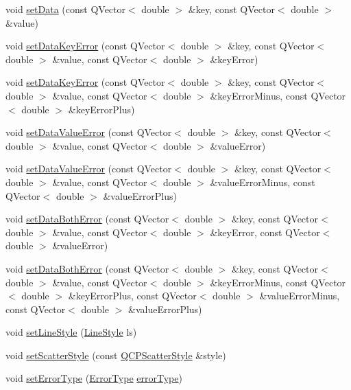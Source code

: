 \begin{DoxyCompactItemize}
\item 
void \hyperlink{classQCPGraph_a4c55d8ac13bfa42c8c93747820891a76}{set\+Data} (const Q\+Vector$<$ double $>$ \&key, const Q\+Vector$<$ double $>$ \&value)
\item 
void \hyperlink{classQCPGraph_abce9f07c0d722bc3e4fa7bd73c7e5dfa}{set\+Data\+Key\+Error} (const Q\+Vector$<$ double $>$ \&key, const Q\+Vector$<$ double $>$ \&value, const Q\+Vector$<$ double $>$ \&key\+Error)
\item 
void \hyperlink{classQCPGraph_ac15c749c5fedf740d5692c6fe67143b8}{set\+Data\+Key\+Error} (const Q\+Vector$<$ double $>$ \&key, const Q\+Vector$<$ double $>$ \&value, const Q\+Vector$<$ double $>$ \&key\+Error\+Minus, const Q\+Vector$<$ double $>$ \&key\+Error\+Plus)
\item 
void \hyperlink{classQCPGraph_acba6296eadcb36b93267628b8dae3de5}{set\+Data\+Value\+Error} (const Q\+Vector$<$ double $>$ \&key, const Q\+Vector$<$ double $>$ \&value, const Q\+Vector$<$ double $>$ \&value\+Error)
\item 
void \hyperlink{classQCPGraph_a3afbfd7222d739351c69387904776f93}{set\+Data\+Value\+Error} (const Q\+Vector$<$ double $>$ \&key, const Q\+Vector$<$ double $>$ \&value, const Q\+Vector$<$ double $>$ \&value\+Error\+Minus, const Q\+Vector$<$ double $>$ \&value\+Error\+Plus)
\item 
void \hyperlink{classQCPGraph_a873fe46bdb20be5710428e474ade8908}{set\+Data\+Both\+Error} (const Q\+Vector$<$ double $>$ \&key, const Q\+Vector$<$ double $>$ \&value, const Q\+Vector$<$ double $>$ \&key\+Error, const Q\+Vector$<$ double $>$ \&value\+Error)
\item 
void \hyperlink{classQCPGraph_abb75736ecdbf6e6a7501e1da64fb18cf}{set\+Data\+Both\+Error} (const Q\+Vector$<$ double $>$ \&key, const Q\+Vector$<$ double $>$ \&value, const Q\+Vector$<$ double $>$ \&key\+Error\+Minus, const Q\+Vector$<$ double $>$ \&key\+Error\+Plus, const Q\+Vector$<$ double $>$ \&value\+Error\+Minus, const Q\+Vector$<$ double $>$ \&value\+Error\+Plus)
\item 
void \hyperlink{classQCPGraph_a513fecccff5b2a50ce53f665338c60ff}{set\+Line\+Style} (\hyperlink{classQCPGraph_ad60175cd9b5cac937c5ee685c32c0859}{Line\+Style} ls)
\item 
void \hyperlink{classQCPGraph_a12bd17a8ba21983163ec5d8f42a9fea5}{set\+Scatter\+Style} (const \hyperlink{classQCPScatterStyle}{Q\+C\+P\+Scatter\+Style} \&style)
\item 
void \hyperlink{classQCPGraph_ac3614d799c3894f2bc646e99c7f73d38}{set\+Error\+Type} (\hyperlink{classQCPGraph_ad23b514404bd2cb3216f57c90904d6af}{Error\+Type} \hyperlink{classQCPGraph_a250bcdf78abac87bc6d46ee6fd99a92d}{error\+Type})

\end{DoxyCompactItemize}
